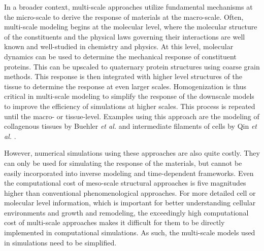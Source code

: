     In a broader context, multi-scale approaches utilize fundamental mechanisms at the micro-scale to derive the response of materials at the macro-scale. Often, multi-scale modeling begins at the molecular level, where the molecular structure of the constituents and the physical laws governing their interactions are well known and well-studied in chemistry and physics. At this level, molecular dynamics can be used to determine the mechanical response of constituent proteins. This can be upscaled to quaternary protein structures using coarse grain methods. This response is then integrated with higher level structures of the tissue to determine the response at even larger scales. Homogenization is thus critical in multi-scale modeling to simplify the response of the downscale models to improve the efficiency of simulations at higher scales. This process is repeated until the macro- or tissue-level. Examples using this approach are the modeling of collagenous tissues by Buehler \textit{et al.} \cite{buehler_atomistic_2006, buehler_nanomechanics_2008} and intermediate filaments of cells by Qin \textit{et al.} \cite{qin_multi_2010}. 
    
    
    However, numerical simulations using these approaches are also quite costly. They can only be used for simulating the response of the materials, but cannot be easily incorporated into inverse modeling and time-dependent frameworks. Even the computational cost of meso-scale structural approaches is five magnitudes higher than conventional phenomenological approaches. For more detailed cell or molecular level information, which is important for better understanding cellular environments and growth and remodeling, the exceedingly high computational cost of multi-scale approaches makes it difficult for them to be directly implemented in computational simulations. As such, the multi-scale models used in simulations need to be simplified.

